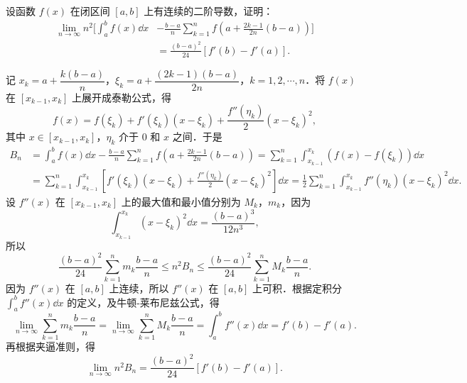 设函数 $f(x)$ 在闭区间 $[a,b]$ 上有连续的二阶导数，证明：
\begin{align*}
\lim_{n\to\infty}n^{2}\Bigg[\int_{a}^{b}f(x)\dd x&-\frac{b-a}{n}\sum_{k=1}^{n}f\left(a+\frac{2k-1}{2n}(b-a)\right)\Bigg]\\
&=\frac{(b-a)^{2}}{24}\left[f'(b)-f'(a)\right].
\end{align*}
\begin{solution}
记 $x_{k}=a+\dfrac{k(b-a)}{n}$，$\xi_{k}=a+\dfrac{(2k-1)(b-a)}{2n}$，$k=1,2,\cdots,n$．将 $f(x)$ 在 $[x_{k-1},x_{k}]$ 上展开成泰勒公式，得
\[
f(x)=f(\xi_{k})+f'(\xi_{k})(x-\xi_{k})+\frac{f''(\eta_{k})}{2}(x-\xi_{k})^{2},
\]
其中 $x\in[x_{k-1},x_{k}]$，$\eta_{k}$ 介于 $0$ 和 $x$ 之间．于是
\begin{align*}
B_{n}&=\int_{a}^{b}f(x)\dd x-\frac{b-a}{n}\sum_{k=1}^{n}f\left(a+\frac{2k-1}{2n}(b-a)\right)
=\sum_{k=1}^{n}\int_{x_{k-1}}^{x_{k}}\left(f(x)-f(\xi_{k})\right)\dd x\\
&=\sum_{k=1}^{n}\int_{x_{k-1}}^{x_{k}}\left[f'(\xi_{k})(x-\xi_{k})+\frac{f''(\eta_{k})}{2}(x-\xi_{k})^{2}\right]\dd x
=\frac{1}{2}\sum_{k=1}^{n}\int_{x_{k-1}}^{x_{k}}f''(\eta_{k})(x-\xi_{k})^{2}\dd x.
\end{align*}
设 $f''(x)$ 在 $[x_{k-1},x_{k}]$ 上的最大值和最小值分别为 $M_{k}$，$m_{k}$，因为
\[
\int_{x_{k-1}}^{x_{k}}(x-\xi_{k})^{2}\dd x=\frac{(b-a)^{3}}{12n^{3}},
\]
所以
\[
\frac{(b-a)^{2}}{24}\sum_{k=1}^{n}m_{k}\frac{b-a}{n}\le n^{2}B_{n}\le\frac{(b-a)^{2}}{24}\sum_{k=1}^{n}M_{k}\frac{b-a}{n}.
\]
因为 $f''(x)$ 在 $[a,b]$ 上连续，所以 $f''(x)$ 在 $[a,b]$ 上可积．根据定积分 $\displaystyle\int_{a}^{b}f''(x)\dd x$ 的定义，及牛顿-莱布尼兹公式，得
\[
\lim_{n\to\infty}\sum_{k=1}^{n}m_{k}\frac{b-a}{n}=\lim_{n\to\infty}\sum_{k=1}^{n}M_{k}\frac{b-a}{n}=\int_{a}^{b}f''(x)\dd x=f'(b)-f'(a).
\]
再根据夹逼准则，得
\[
\lim_{n\to\infty}n^{2}B_{n}=\frac{(b-a)^{2}}{24}\left[f'(b)-f'(a)\right].
\]
\end{solution}

